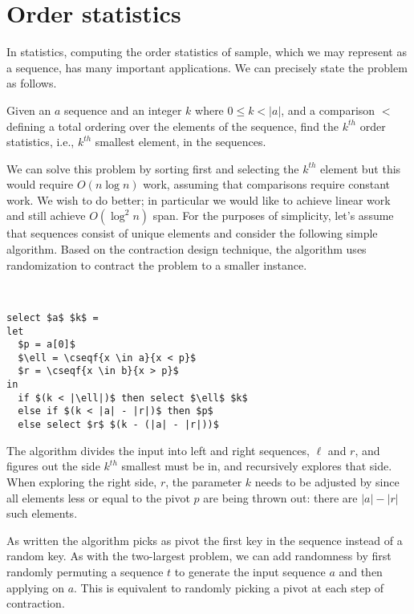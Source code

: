 {\section{Order statistics}
\label{sec:randomized::select}
\label{sec:kth-smallest}

In statistics, computing the order statistics of sample, which we may
represent as a sequence, has many important applications. 
%
We can precisely state the problem as follows.

\begin{problem}
  Given an $a$ sequence and an integer $k$ where $0 \leq k < |a|$, and a
  comparison $<$ defining a total ordering over the elements of the
  sequence, find the $k^{th}$ order statistics, i.e.,  $k^{th}$ smallest element, in the sequences.
\end{problem}

\newcommand{\ksmall}{\cd{select}\xspace}

We can solve this problem by sorting first and selecting the $k^{th}$
element but this would require $O(n \log n)$ work, assuming that
comparisons require constant work.
%
We wish to do better; in particular we would like to
achieve linear work and still achieve $O(\log^2 n)$ span.  
%
For the purposes of simplicity, let's assume that sequences consist of
unique elements and consider the following simple algorithm.  Based on
the contraction design technique, the algorithm uses randomization to
contract the problem to a smaller instance.
%
\begin{algorithm}~
\begin{lstlisting}
select $a$ $k$ = 
let
  $p = a[0]$
  $\ell = \cseqf{x \in a}{x < p}$
  $r = \cseqf{x \in b}{x > p}$
in
  if $(k < |\ell|)$ then select $\ell$ $k$
  else if $(k < |a| - |r|)$ then $p$
  else select $r$ $(k - (|a| - |r|))$
\end{lstlisting}
\end{algorithm}
%
%
The algorithm divides the input into left and right sequences, $\ell$
and $r$, and figures out the side $k^{th}$ smallest must be in, and
recursively explores that side.  
%
When exploring the right side, $r$, the parameter $k$ needs to be
adjusted by since all elements less or equal to the pivot $p$ are
being thrown out: there are $|a|-|r|$ such elements.
%

As written the algorithm picks as pivot the first key in the sequence
instead of a random key.
%
As with the two-largest problem, we can add randomness by first
randomly permuting a sequence $t$ to generate the input sequence $a$
and then applying \ksmall on $a$.
%
This is equivalent to randomly picking a pivot at each step of
contraction.

}
